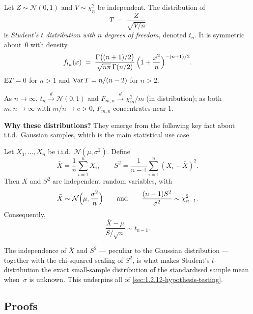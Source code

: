 \begin{definition}
\label{def:t-distribution}
Let $Z \sim \mathcal{N}(0, 1)$ and $V \sim \chi^2_n$ be independent.
The distribution of
\[
  T \;=\; \frac{Z}{\sqrt{V / n}}
\]
is \emph{Student's $t$ distribution with $n$ degrees of freedom},
denoted $t_n$. It is symmetric about~$0$ with density
\[
  f_{t_n}(x) \;=\; \frac{\Gamma\bigl((n+1)/2\bigr)}{\sqrt{n \pi}\, \Gamma(n/2)}\, \Bigl(1 + \frac{x^2}{n}\Bigr)^{-(n+1)/2}.
\]
$\mathbb{E} T = 0$ for $n > 1$ and $\operatorname{Var} T = n/(n - 2)$ for $n > 2$.
\end{definition}

\begin{proposition}
\label{prop:asymptotics-chi2-f-t}
As $n \to \infty$, $t_n \xrightarrow{d} \mathcal{N}(0, 1)$ and
$F_{m, n} \xrightarrow{d} \chi^2_m / m$ (in distribution); as both
$m, n \to \infty$ with $m / n \to c > 0$, $F_{m, n}$ concentrates
near $1$.
\end{proposition}

\medskip
\noindent\textbf{Why these distributions?} They emerge from the
following key fact about i.i.d.\ Gaussian samples, which is the
main statistical use case.

\begin{theorem}
\label{thm:sample-mean-variance}
Let $X_1, \dots, X_n$ be i.i.d.\ $\mathcal{N}(\mu, \sigma^2)$. Define
\[
  \bar X = \frac{1}{n} \sum_{i=1}^{n} X_i, \qquad
  S^2 = \frac{1}{n - 1} \sum_{i=1}^{n} (X_i - \bar X)^2.
\]
Then $\bar X$ and $S^2$ are independent random variables, with
\[
  \bar X \sim \mathcal{N}\Bigl(\mu, \frac{\sigma^2}{n}\Bigr) \qquad \text{and} \qquad
  \frac{(n - 1) S^2}{\sigma^2} \sim \chi^2_{n - 1}.
\]
Consequently,
\[
  \frac{\bar X - \mu}{S / \sqrt n} \sim t_{n - 1}.
\]
\end{theorem}

The independence of $\bar X$ and $S^2$ — peculiar to the Gaussian
distribution — together with the chi-squared scaling of $S^2$, is
what makes Student's $t$-distribution the exact small-sample
distribution of the standardised sample mean when~$\sigma$ is
unknown. This underpins all of \cref{sec:1.2.12-hypothesis-testing}.

\subsection*{Proofs}

